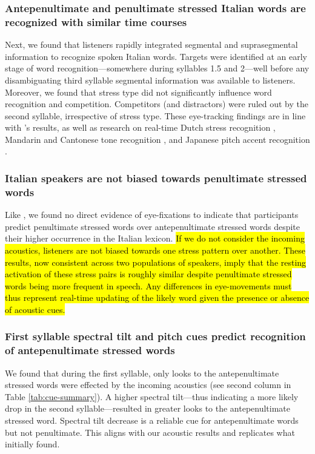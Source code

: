 \subsubsection{Antepenultimate and penultimate stressed Italian words are recognized with similar time courses}
Next, we found that listeners rapidly integrated segmental and suprasegmental information to recognize spoken Italian words. Targets were identified at an early stage of word recognition---somewhere during syllables 1.5 and 2---well before any disambiguating third syllable segmental information was available to listeners. Moreover, we found that stress type did not significantly influence word recognition and competition. Competitors (and distractors) were ruled out by the second syllable, irrespective of stress type. These eye-tracking findings are in line with \cite{Sulpizio_McQueen_2012}'s results, as well as research on real-time Dutch stress recognition \citep{Reinisch2010}, Mandarin and Cantonese tone recognition \citep{zou_2022, qin_2022, Nixon2016}, and Japanese pitch accent recognition \citep{Ito2024}. 




\subsubsection{Italian speakers are not biased towards penultimate stressed words}
Like \cite{Sulpizio_McQueen_2012}, we found no direct evidence of eye-fixations to indicate that participants predict penultimate stressed words over antepenultimate stressed words despite their higher occurrence in the Italian lexicon. \hl{If we do not consider the incoming acoustics, listeners are not biased towards one stress pattern over another. These results, now consistent across two populations of speakers, imply that the resting activation of these stress pairs is roughly similar despite penultimate stressed words being more frequent in speech. Any differences in eye-movements must thus represent real-time updating of the likely word given the presence or absence of acoustic cues.}

\subsubsection{First syllable spectral tilt and pitch cues predict recognition of antepenultimate stressed words}
We found that during the first syllable, only looks to the antepenultimate stressed words were effected by the incoming acoustics (see second column in Table \ref{tab:cue-summary}). A higher spectral tilt---thus indicating a more likely drop in the second syllable---resulted in greater looks to the antepenultimate stressed word. Spectral tilt decrease is a reliable cue for antepenultimate words but not penultimate. This aligns with our acoustic results and replicates what \citep{Sulpizio_McQueen_2012} initially found. 

